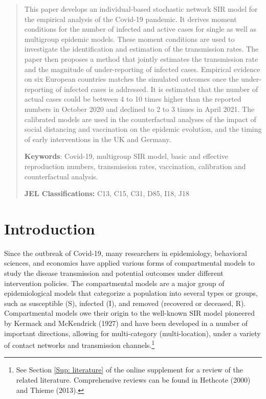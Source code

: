 \documentclass[12pt]{article}
\begin{document}
\begin{abstract}
This paper develops an individual-based stochastic network SIR model for the
empirical analysis of the Covid-19 pandemic. It derives moment conditions for
the number of infected and active cases for single as well as multigroup
epidemic models. These moment conditions are used to investigate the
identification and estimation of the transmission rates. The paper then
proposes a method that jointly estimates the transmission rate and the
magnitude of under-reporting of infected cases. Empirical evidence on six
European countries matches the simulated outcomes once the under-reporting of
infected cases is addressed. It is estimated that the number of actual cases
could be between 4 to 10 times higher than the reported numbers in October
2020 and declined to 2 to 3 times in April 2021. The calibrated models are
used in the counterfactual analyses of the impact of social distancing and
vaccination on the epidemic evolution, and the timing of early interventions
in the UK and Germany.





%

\vspace{0.4cm}%


\textbf{Keywords}: Covid-19, multigroup SIR model, basic and effective
reproduction numbers, transmission rates, vaccination, calibration and
counterfactual analysis.

\textbf{JEL Classifications: }C13, C15, C31, D85, I18, J18

\end{abstract}


\baselineskip0.245in

\newpage{} \setcounter{page}{1} \doublespacing


\section{Introduction}

Since the outbreak of Covid-19, many researchers in epidemiology, behavioral
sciences, and economics have applied various forms of compartmental models to
study the disease transmission and potential outcomes under different
intervention policies. The compartmental models are a major group of
epidemiological models that categorize a population into several types or
groups, such as susceptible (S), infected (I), and removed (recovered or
deceased, R). Compartmental models owe their origin to the well-known SIR
model pioneered by Kermack and McKendrick (1927) and have been developed in a
number of important directions, allowing for multi-category (multi-location),
under a variety of contact networks and transmission channels.\footnote{See
Section \ref{Sup: literature} of the online supplement for a review of the
related literature. Comprehensive reviews can be found in Hethcote (2000) and
Thieme (2013).}
\end{document}
